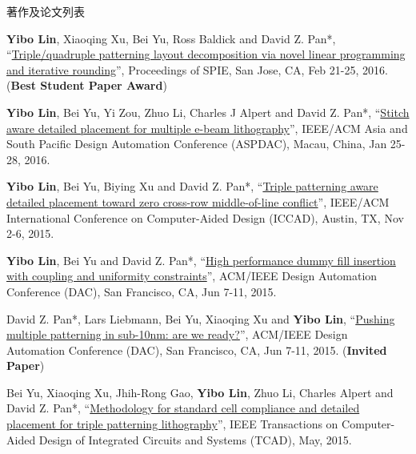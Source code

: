 \begin{rSection}{著作及论文列表}
\begin{description}[font=\normalfont, rightmargin=2em]
\item[{[C6]}]{
        \textbf{Yibo Lin}, Xiaoqing Xu, Bei Yu, Ross Baldick and David Z. Pan*, 
    ``\href{http://dx.doi.org/10.1117/12.2218628}{Triple/quadruple patterning layout decomposition via novel linear programming and iterative rounding}'', 
    Proceedings of SPIE, San Jose, CA, Feb 21-25, 2016.
    (\textbf{Best Student Paper Award})
}
            

\item[{[C5]}]{
        \textbf{Yibo Lin}, Bei Yu, Yi Zou, Zhuo Li, Charles J Alpert and David Z. Pan*, 
    ``\href{http://ieeexplore.ieee.org/xpl/articleDetails.jsp?arnumber=7428009}{Stitch aware detailed placement for multiple e-beam lithography}'', 
    IEEE/ACM Asia and South Pacific Design Automation Conference (ASPDAC), Macau, China, Jan 25-28, 2016.
    
}
            

\item[{[C4]}]{
        \textbf{Yibo Lin}, Bei Yu, Biying Xu and David Z. Pan*, 
    ``\href{http://dl.acm.org/citation.cfm?id=2840875}{Triple patterning aware detailed placement toward zero cross-row middle-of-line conflict}'', 
    IEEE/ACM International Conference on Computer-Aided Design (ICCAD), Austin, TX, Nov 2-6, 2015.
    
}
            

\item[{[C3]}]{
        \textbf{Yibo Lin}, Bei Yu and David Z. Pan*, 
    ``\href{http://dl.acm.org/citation.cfm?id=2744769.2744850}{High performance dummy fill insertion with coupling and uniformity constraints}'', 
    ACM/IEEE Design Automation Conference (DAC), San Francisco, CA, Jun 7-11, 2015.
    
}
            

\item[{[C2]}]{
        David Z. Pan*, Lars Liebmann, Bei Yu, Xiaoqing Xu and \textbf{Yibo Lin}, 
    ``\href{http://dl.acm.org/citation.cfm?id=2744769.2747940}{Pushing multiple patterning in sub-10nm: are we ready?}'', 
    ACM/IEEE Design Automation Conference (DAC), San Francisco, CA, Jun 7-11, 2015.
    (\textbf{Invited Paper})
}
            

\item[{[J1]}]{
        Bei Yu, Xiaoqing Xu, Jhih-Rong Gao, \textbf{Yibo Lin}, Zhuo Li, Charles Alpert and David Z. Pan*, 
    ``\href{https://doi.org/10.1109/TCAD.2015.2401571}{Methodology for standard cell compliance and detailed placement for triple patterning lithography}'', 
    IEEE Transactions on Computer-Aided Design of Integrated Circuits and Systems (TCAD), May, 2015.
    
}
            

\end{description}
    

\end{rSection}


